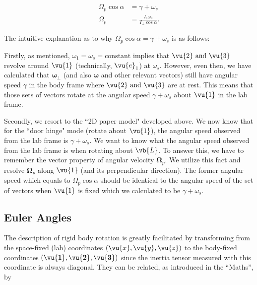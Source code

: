 \documentclass[a4paper,12pt]{report}
\begin{document}
\begin{equation}
	\begin{aligned}
		\Omega _{p}\cos \alpha  &= \gamma + \omega _{s} \\
		\Omega _{p} &= \frac{I_1 \omega _{s} }{I_{\perp } \cos \alpha } .
	\end{aligned}
\end{equation}




The intuitive explanation as to why \(\Omega _{p} \cos \alpha = \gamma + \omega _{s}\) is as follows: 

Firstly, as mentioned, \(\omega _{1} = \omega _{s} = \text{constant} \) implies that \(\vu{2} \text{ and } \vu{3} \) revolve around \(\vu{1} \) (technically, \(\vu{e} _{1} \))  at \(\omega _{s} \). However, even then, we have calculated that \(\boldsymbol{\omega } _{\perp } \) (and also  \(\boldsymbol{\omega } \) and other relevant vectors) still have angular speed \(\gamma \) in the body frame where \(\vu{2} \text{ and } \vu{3} \) are at rest. This means that those sets of vectors rotate at the angular speed \(\gamma + \omega _{s}\) about \(\vu{1} \) in the lab frame.

Secondly, we resort to the ``2D paper model" developed above. We now know that for the ``door hinge" mode (rotate about \(\vu{1} \)), the angular speed observed from the lab frame is \(\gamma + \omega _{s} \).  We want to know what the angular speed observed from the lab frame is when rotating about \(\vb{L} \). To answer this, we have to remember the vector property of angular velocity \(\boldsymbol{\Omega } _{p} \). We utilize this fact and resolve \(\boldsymbol{\Omega } _{p} \) along \(\vu{1} \) (and its perpendicular direction). The former angular speed which equals to \(\Omega _{p} \cos \alpha \) should be identical to the angular speed of the set of vectors when \(\vu{1} \) is fixed which we calculated to be \(\gamma + \omega _{s} \).  

\subsection{Euler Angles}

The description of rigid body rotation is greatly facilitated by transforming from the space-fixed (lab) coordinates \((\vu{x} ,\vu{y} ,\vu{z} )\)  to the body-fixed coordinates \((\vu{\boldsymbol{1}  }, \vu{\boldsymbol{2}}, \vu{\boldsymbol{3}  })\) since the inertia tensor measured with this coordinate is always diagonal. They can be related, as introduced in the ``Maths'', by
\end{document}
